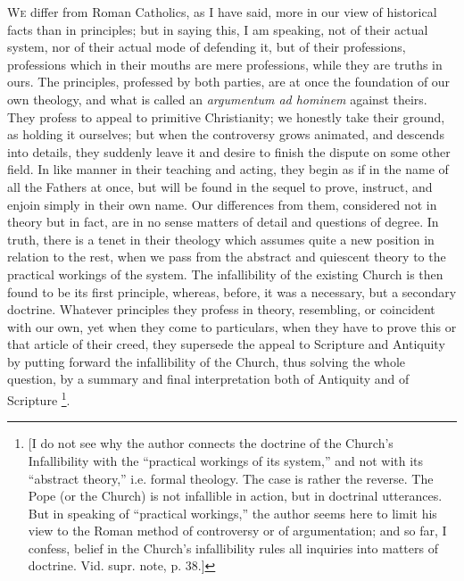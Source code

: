
W\textsc{e} differ from Roman Catholics, as I have said, more in our
view of historical facts than in principles; but in saying this, I am
speaking, not of their actual system, nor of their actual mode of
defending it, but of their professions, professions which in their
mouths are mere professions, while they are truths in ours. The
principles, professed by both parties, are at once the foundation of
our own theology, and what is called an \emph{argumentum ad hominem}
against theirs. They profess to appeal to primitive Christianity; we
honestly take their ground, as holding it ourselves; but when the
controversy grows animated, and descends into details, they suddenly
leave it and desire to finish the dispute on some other field. In like
manner in their teaching and acting, they begin as if in the name of
all the Fathers at once, but will be found in the sequel to prove,
instruct, and enjoin simply in their own name. Our differences from
them, considered not in theory but in fact, are in no sense matters of
detail and questions of degree. In truth, there is a tenet in their
theology which assumes quite a new position in relation to the rest,
when we pass from the abstract and quiescent theory to the practical
workings of the system. The infallibility of the existing Church is
then found to be its first principle, whereas, before, it was a
necessary, but a secondary doctrine. Whatever principles they profess
in theory, resembling, or coincident with our own, yet when they come
to particulars, when they have to prove this or that article of their
creed, they supersede the appeal to Scripture and Antiquity by putting
forward the infallibility of the Church, thus solving the whole
question, by a summary and final interpretation both of Antiquity and
of Scripture \footnote{[I do not see why the author connects the doctrine of the Church's
Infallibility with the ``practical workings of its system,''
and not with its ``abstract theory,'' i.e. formal theology.
The case is rather the reverse. The Pope (or the Church) is not
infallible in action, but in doctrinal utterances. But in speaking of
``practical workings,'' the author seems here to limit his
view to the Roman method of controversy or of argumentation; and so
far, I confess, belief in the Church's infallibility rules all
inquiries into matters of doctrine. Vid. supr. note, p. 38.]}.

